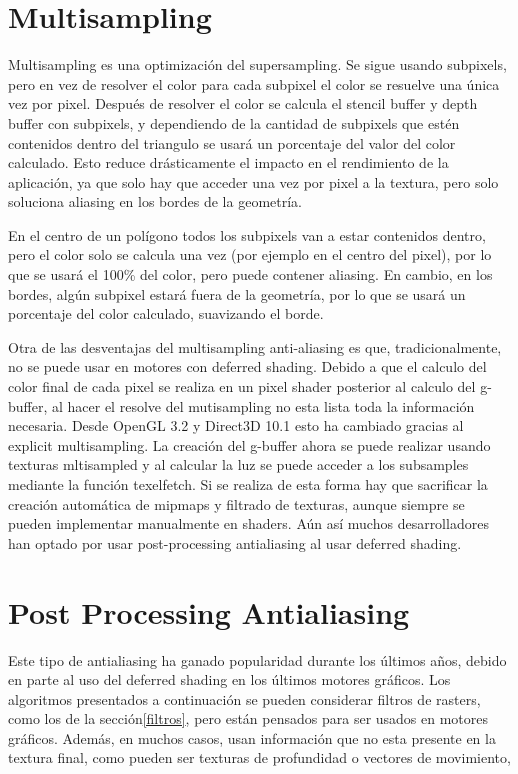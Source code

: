 \documentclass[withindex, glossary]{cam-thesis}
\begin{document}
\section{Multisampling}

Multisampling es una optimización del supersampling. Se sigue usando subpixels, pero en vez de resolver el color para cada subpixel el color se resuelve una única vez por pixel. Después de resolver el color se calcula el stencil buffer y depth buffer con subpixels, y dependiendo de la cantidad de subpixels que estén contenidos dentro del triangulo se usará un porcentaje del valor del color calculado. Esto reduce drásticamente el impacto en el rendimiento de la aplicación, ya que solo hay que acceder una vez por pixel a la textura, pero solo soluciona aliasing en los bordes de la geometría.

En el centro de un polígono todos los subpixels van a estar contenidos dentro, pero el color solo se calcula una vez (por ejemplo en el centro del pixel), por lo que se usará el 100\% del color, pero puede contener aliasing. En cambio, en los bordes, algún subpixel estará fuera de la geometría, por lo que se usará un porcentaje del color calculado, suavizando el borde.

Otra de las desventajas del multisampling anti-aliasing es que, tradicionalmente, no se puede usar en motores con deferred shading. Debido a que el calculo del color final de cada pixel se realiza en un pixel shader posterior al calculo del g-buffer, al hacer el resolve del mutisampling no esta lista toda la información necesaria. Desde OpenGL 3.2 y Direct3D 10.1 esto ha cambiado gracias al explicit multisampling\cite{textureMultisample}. La creación del g-buffer ahora se puede realizar usando texturas mltisampled y al calcular la luz se puede acceder a los subsamples mediante la función texelfetch. Si se realiza de esta forma hay que sacrificar la creación automática de mipmaps y filtrado de texturas, aunque siempre se pueden implementar manualmente en shaders. Aún así muchos desarrolladores han optado por usar post-processing antialiasing al usar deferred shading.

\section{Post Processing Antialiasing}

Este tipo de antialiasing ha ganado popularidad durante los últimos años, debido en parte al uso del deferred shading en los últimos motores gráficos. Los algoritmos presentados a continuación se pueden considerar filtros de rasters, como los de la sección\ref{filtros}, pero están pensados para ser usados en motores gráficos. Además, en muchos casos, usan información que no esta presente en la textura final, como pueden ser texturas de profundidad o vectores de movimiento,
\end{document}
